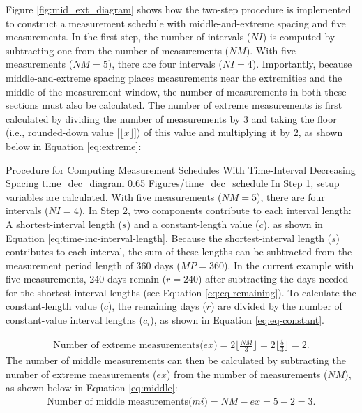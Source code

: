 \documentclass[
12pt, %
twoside,
english]{guelphthesis}
\begin{document}
Figure \ref{fig:mid_ext_diagram} shows how the two-step procedure is implemented to construct a measurement schedule with middle-and-extreme spacing and five measurements. In the first step, the number of intervals (\(NI\)) is computed by subtracting one from the number of measurements (\(NM\)). With five measurements (\(NM = 5\)), there are four intervals (\(NI = 4\)). Importantly, because middle-and-extreme spacing places measurements near the extremities and the middle of the measurement window, the number of measurements in both these sections must also be calculated. The number of extreme measurements is first calculated by dividing the number of measurements by 3 and taking the floor (i.e., rounded-down value {[}\(\lfloor x\rfloor\){]}) of this value and multiplying it by 2, as shown below in Equation \ref{eq:extreme}:
\begin{apaFigure}
[landscape]
[samepage]
{Procedure for Computing Measurement Schedules With Time-Interval Decreasing Spacing}
{time_dec_diagram}
{0.65}
{Figures/time_dec_schedule}
{In Step 1, setup variables are calculated. With five measurements ($NM = 5$), there are four intervals ($NI = 4$). In Step 2, two components contribute to each interval length: A shortest-interval length ($s$) and a constant-length value ($c$), as shown in Equation \ref{eq:time-inc-interval-length}. Because the shortest-interval length ($s$) contributes to each interval, the sum of these lengths can be subtracted from the measurement period length of 360 days ($MP = 360$). In the current example with five measurements, 240 days remain ($r = 240$) after subtracting the days needed for the shortest-interval lengths (see Equation \ref{eq:eq-remaining}). To calculate the constant-length value ($c$), the remaining days ($r$) are divided by the number of constant-value interval lengths ($c_i$), as shown in Equation \ref{eq:eq-constant}.}
\end{apaFigure}
\begin{align}
\text{Number of extreme measurements(} \textit{ex}\text{)} = 2\lfloor\frac{NM}{3}\rfloor = 2\lfloor\frac{5}{3}\rfloor = 2.
  \label{eq:extreme} 
\end{align}
\noindent The number of middle measurements can then be calculated by subtracting the number of extreme measurements (\(ex\)) from the number of measurements (\(NM\)), as shown below in Equation \ref{eq:middle}:
\begin{align}
\text{Number of middle measurements(} \textit{mi}\text{)} = NM - ex = 5 - 2 = 3.
  \label{eq:middle} 
\end{align}
\end{document}

